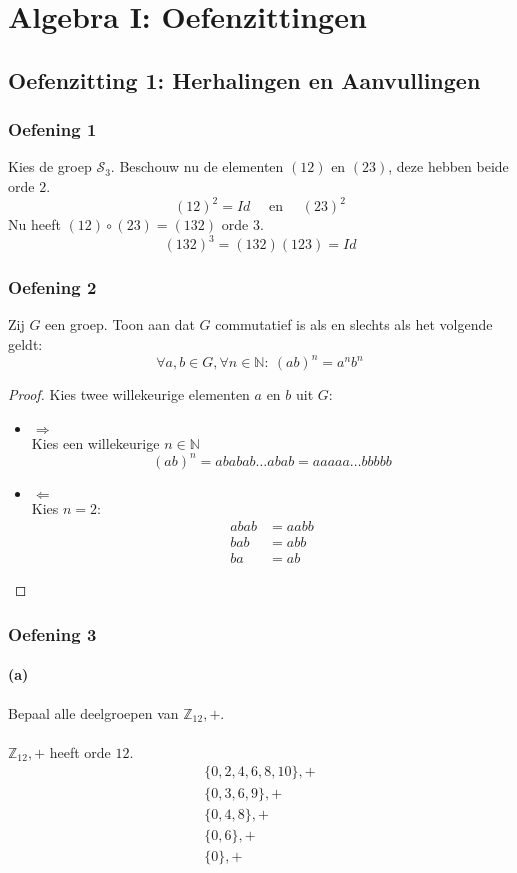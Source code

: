 \documentclass[main.tex]{subfiles}
\begin{document}
\chapter{Algebra I: Oefenzittingen}
\label{cha:algebra-i-oefenzittingen}

\section{Oefenzitting 1: Herhalingen en Aanvullingen}
\subsection*{Oefening 1}
\label{oza:oz1-oef1}
Kies de groep $\mathcal{S}_{3}$.
Beschouw nu de elementen $(12)$ en $(23)$, deze hebben beide orde $2$.
\[ (12)^{2} = Id \quad\text{ en }\quad (23)^{2} \]
Nu heeft $(12) \circ (23) = (132)$ orde $3$.
\[ (132)^{3} = (132)(123) = Id \]

\subsection*{Oefening 2}
\label{oza:oz1-oef2}
Zij $G$ een groep.
Toon aan dat $G$ commutatief is als en slechts als het volgende geldt:
\[ \forall a,b \in G, \forall n \in \mathbb{N}:\ (ab)^{n} = a^{n}b^{n} \]

\begin{proof}
  Kies twee willekeurige elementen $a$ en $b$ uit $G$:
  \begin{itemize}
  \item $\Rightarrow$\\
    Kies een willekeurige $n\in \mathbb{N}$
    \[ (ab)^{n} = ababab \ldots abab = aaaaa \ldots bbbbb \]
  \item $\Leftarrow$\\
    Kies $n=2$:
    \[ 
    \begin{array}{rl}
       abab &= aabb\\
       bab &= abb\\
       ba &= ab
    \end{array}
    \]
  \end{itemize}
\end{proof}

\subsection*{Oefening 3}
\label{oza:oz1-oef3}

\subsubsection*{(a)}
Bepaal alle deelgroepen van $\mathbb{Z}_{12},+$.\\\\
$\mathbb{Z}_{12},+$ heeft orde $12$.
\[
\begin{array}{c}
  \{ 0,2,4,6,8,10 \},+\\
  \{ 0,3,6,9 \},+\\
  \{ 0,4,8 \},+\\
  \{ 0,6 \},+\\
  \{ 0 \},+\\
\end{array}
\]
\end{document}
